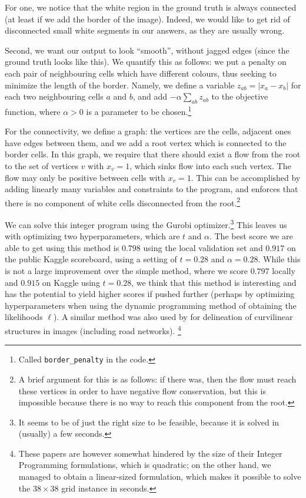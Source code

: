 \documentclass[10pt,conference,compsocconf]{IEEEtran}
\begin{document}
For one, we notice that the white region in the ground truth is always connected (at least if we add the border of the image). Indeed, we would like to get rid of disconnected small white segments in our answers, as they are usually wrong.

Second, we want our output to look ``smooth'', without jagged edges (since the ground truth looks like this). We quantify this as follows: we put a penalty on each pair of neighbouring cells which have different colours, thus seeking to minimize the length of the border. Namely, we define a variable $z_{ab} = |x_a - x_b|$ for each two neighbouring cells $a$ and $b$, and add $- \alpha \sum_{ab} z_{ab}$ to the objective function, where $\alpha > 0$ is a parameter to be chosen.\footnote{Called \texttt{border\_penalty} in the code.}

For the connectivity, we define a graph: the vertices are the cells, adjacent ones have edges between them, and we add a root vertex which is connected to the border cells. In this graph, we require that there should exist a flow from the root to the set of vertices $v$ with $x_v = 1$, which sinks flow into each such vertex. The flow may only be positive between cells with $x_v = 1$. This can be accomplished by adding linearly many variables and constraints to the program, and enforces that there is no component of white cells disconnected from the root.\footnote{A brief argument for this is as follows: if there was, then the flow must reach these vertices in order to have negative flow conservation, but this is impossible because there is no way to reach this component from the root.}

We can solve this integer program using the Gurobi optimizer.\footnote{It seems to be of just the right size to be feasible, because it is solved in (usually) a few seconds.} This leaves us with optimizing two hyperparameters, which are $t$ and $\alpha$. The best score we are able to get using this method is $0.798$ using the local validation set and $0.917$ on the public Kaggle scoreboard, using a setting of $t = 0.28$ and $\alpha = 0.28$. While this is not a large improvement over the simple method, where we score $0.797$ locally and $0.915$ on Kaggle using $t = 0.28$, we think that this method is interesting and has the potential to yield higher scores if pushed further (perhaps by optimizing hyperparameters when using the dynamic programming method of obtaining the likelihoods $\ell$). A similar method was also used by \cite{??,??} for delineation of curvilinear structures in images (including road networks).
\footnote{These papers are however somewhat hindered by the size of their Integer Programming formulations, which is quadratic; on the other hand, we managed to obtain a linear-sized formulation, which makes it possible to solve the $38 \times 38$ grid instance in seconds.}
\end{document}
